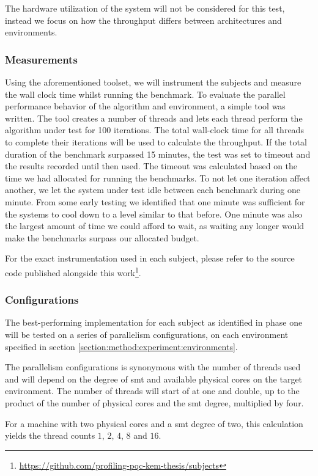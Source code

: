 The hardware utilization of the system will not be considered for this test, instead we focus on how the throughput differs between architectures and environments.

\subsubsection{Measurements}
\label{section:method:experiment:phase2:measurements}

Using the aforementioned toolset, we will instrument the subjects and measure the wall clock time whilst running the benchmark. To evaluate the parallel performance behavior of the algorithm and environment, a simple tool was written. The tool creates a number of threads and lets each thread perform the algorithm under test for 100 iterations. The total wall-clock time for all threads to complete their iterations will be used to calculate the throughput. If the total duration of the benchmark surpassed 15 minutes, the test was set to timeout and the results recorded until then used. The timeout was calculated based on the time we had allocated for running the benchmarks. To not let one iteration affect another, we let the system under test idle between each benchmark during one minute. From some early testing we identified that one minute was sufficient for the systems to cool down to a level similar to that before. One minute was also the largest amount of time we could afford to wait, as waiting any longer would make the benchmarks surpass our allocated budget.

For the exact instrumentation used in each subject, please refer to the source code published alongside this work\footnote{\href{https://github.com/profiling-pqc-kem-thesis/subjects}{https://github.com/profiling-pqc-kem-thesis/subjects}}.

\subsubsection{Configurations}
\label{section:method:experiment:phase2:configurations}

The best-performing implementation for each subject as identified in phase one will be tested on a series of parallelism configurations, on each environment specified in section \ref{section:method:experiment:environments}.

The parallelism configurations is synonymous with the number of threads used and will depend on the degree of \gls{smt} and available physical cores on the target environment. The number of threads will start of at one and double, up to the product of the number of physical cores and the \gls{smt} degree, multiplied by four.

For a machine with two physical cores and a \gls{smt} degree of two, this calculation yields the thread counts $1$, $2$, $4$, $8$ and $16$.